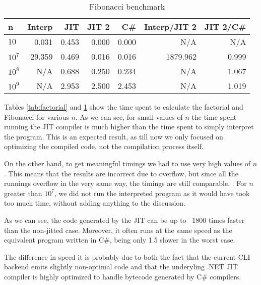 \begin{table}[ht]
  \begin{tabular}{|l|r|r|r|r||r|r|}
    \hline
    \textbf{n} & 
    \textbf{Interp} &
    \textbf{JIT} &
    \textbf{JIT 2} &
    \textbf{C\#} &
    \textbf{Interp/JIT 2} &
    \textbf{JIT 2/C\#} \\
    \hline

    $10$    &   0.031  &  0.453  &  0.000  &  0.000  &       N/A  &  N/A   \\
    $10^7$  &  29.359  &  0.469  &  0.016  &  0.016  &  1879.962  &  0.999 \\
    $10^8$  &     N/A  &  0.688  &  0.250  &  0.234  &       N/A  &  1.067 \\
    $10^9$  &     N/A  &  2.953  &  2.500  &  2.453  &       N/A  &  1.019 \\

    \hline

  \end{tabular}
  \caption{Fibonacci benchmark}
  \label{tab:fibo}
\end{table}


Tables \ref{tab:factorial} and \ref{tab:fibo} show the time spent to calculate
the factorial and Fibonacci for various $n$.  As we can see, for small values
of $n$ the time spent running the JIT compiler is much higher than the time
spent to simply interpret the program.  This is an expected result, as till
now we only focused on optimizing the compiled code, not the compilation
process itself.

On the other hand, to get meaningful timings we had to use very high values of
$n$.  This means that the results are incorrect due to overflow, but since all
the runnings overflow in the very same way, the timings are still
comparable. .  For $n$ greater
than $10^7$, we did not run the interpreted program as it would have took too
much time, without adding anything to the discussion.

As we can see, the code generated by the JIT can be up to ~1800 times faster
than the non-jitted case.  Moreover, it often runs at the same speed as the
equivalent program written in C\#, being only 1.5 slower in the worst case.

The difference in speed it is probably due to both the fact that the current
CLI backend emits slightly non-optimal code and that the underyling .NET JIT
compiler is highly optimized to handle bytecode generated by C\# compilers.

